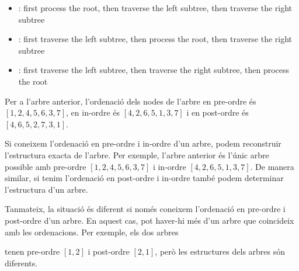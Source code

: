 \begin{itemize}
\item {}: first process the root,
then traverse the left subtree, then traverse the right subtree
\item {}: first traverse the left subtree,
then process the root, then traverse the right subtree
\item {}: first traverse the left subtree,
then traverse the right subtree, then process the root
\end{itemize}


Per a l'arbre anterior, l'ordenació dels nodes de l'arbre en pre-ordre
és $[1,2,4,5,6,3,7]$, en in-ordre és $[4,2,6,5,1,3,7] $ i en
post-ordre és $[4,6,5,2,7,3,1]$.

Si coneixem l'ordenació en pre-ordre i in-ordre d'un arbre, podem
reconstruir l'estructura exacta de l'arbre. Per exemple, l'arbre
anterior és l'únic arbre possible amb pre-ordre $[1,2,4,5,6,3,7]$ i
in-ordre $[4,2,6,5,1,3, 7]$. De manera similar, si tenim l'ordenació
en post-ordre i in-ordre també podem determinar l'estructura d'un
arbre.

Tanmateix, la situació és diferent si només coneixem l'ordenació en
pre-ordre i post-ordre d'un arbre. En aquest cas, pot haver-hi més
d'un arbre que coincideix amb les ordenacions. Per exemple, els dos
arbres
\begin{center}
\end{center}
tenen pre-ordre $[1,2]$ i post-ordre $[2,1]$, però les estructures
dels arbres són diferents.



